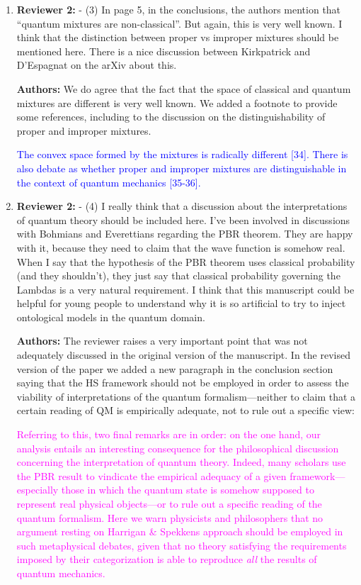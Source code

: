 \documentclass[11pt, executivepaper]{article}
\begin{document}
\begin{enumerate}
\item \textbf{Reviewer 2:} - (3)    In page 5, in the conclusions, the authors mention that “quantum mixtures are non-classical”. But again, this is very well known. I think that the distinction between proper vs improper mixtures should be mentioned here. There is a nice discussion between Kirkpatrick and D’Espagnat on the arXiv about this.
\vspace{2mm}

\textbf{Authors:} We do agree that the fact that the space of classical and quantum mixtures are different is very well known. We added a footnote to provide some references, including to the discussion on the distinguishability of proper and improper mixtures.

\textcolor{blue} {The convex space formed by the mixtures is radically different [34]. There is also debate as whether proper and improper mixtures are distinguishable in the context of quantum mechanics [35-36].
}

\item \textbf{Reviewer 2:} - (4)    I really think that a discussion about the interpretations of quantum theory should be included here. I’ve been involved in discussions with Bohmians and Everettians regarding the PBR theorem. They are happy with it, because they need to claim that the wave function is somehow real. When I say that the hypothesis of the PBR theorem uses classical probability (and they shouldn’t), they just say that classical probability governing the Lambdas is a very natural requirement. I think that this manuscript could be helpful for young people to understand why it is so artificial to try to inject ontological models in the quantum domain.
\vspace{2mm}

\textbf{Authors:} The reviewer raises a very important point that was not adequately discussed in the original version of the manuscript. In the revised version of the paper we added a new paragraph in the conclusion section saying that the HS framework should not be employed in order to assess the viability of interpretations of the quantum formalism---neither to claim that a certain reading of QM is empirically adequate, not to rule out a specific view:

\textcolor{magenta}{Referring to this, two final remarks are in order: on the one hand, our analysis entails an interesting consequence for the philosophical discussion concerning the interpretation of quantum theory. Indeed, many scholars use the PBR result to vindicate the empirical adequacy of a given framework---especially those in which the quantum state is somehow supposed to represent real physical objects---or to rule out a specific reading of the quantum formalism. Here we warn physicists and philosophers that no argument resting on Harrigan \& Spekkens approach should be employed in such metaphysical debates, given that no theory satisfying the requirements imposed by their categorization is able to reproduce \emph{all} the results of quantum mechanics.}


\end{enumerate}
\end{document}
